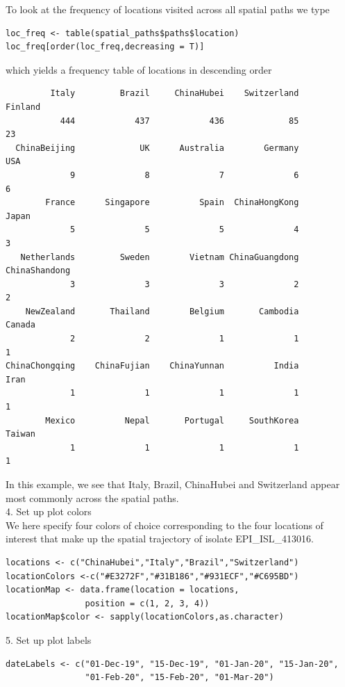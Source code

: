 \documentclass{article}
\begin{document}
To look at the frequency of locations visited across all spatial paths we type
\begin{verbatim}
loc_freq <- table(spatial_paths$paths$location)
loc_freq[order(loc_freq,decreasing = T)]
\end{verbatim}
which yields a frequency table of locations in descending order
\begin{verbatim}
         Italy         Brazil     ChinaHubei    Switzerland        Finland 
           444            437            436             85             23 
  ChinaBeijing             UK      Australia        Germany            USA 
             9              8              7              6              6 
        France      Singapore          Spain  ChinaHongKong          Japan 
             5              5              5              4              3 
   Netherlands         Sweden        Vietnam ChinaGuangdong  ChinaShandong 
             3              3              3              2              2 
    NewZealand       Thailand        Belgium       Cambodia         Canada 
             2              2              1              1              1 
ChinaChongqing    ChinaFujian    ChinaYunnan          India           Iran 
             1              1              1              1              1 
        Mexico          Nepal       Portugal     SouthKorea         Taiwan 
             1              1              1              1              1     
\end{verbatim}

In this example, we see that Italy, Brazil, ChinaHubei and Switzerland appear most commonly across the spatial paths. \\

4. Set up plot colors \\

We here specify four colors of choice corresponding to the four locations of interest that make up the spatial trajectory of isolate EPI\_ISL\_413016.

\begin{verbatim}
locations <- c("ChinaHubei","Italy","Brazil","Switzerland")
locationColors <-c("#E3272F","#31B186","#931ECF","#C695BD")
locationMap <- data.frame(location = locations,
                position = c(1, 2, 3, 4))
locationMap$color <- sapply(locationColors,as.character)                
\end{verbatim}

5. Set up plot labels
\begin{verbatim}
dateLabels <- c("01-Dec-19", "15-Dec-19", "01-Jan-20", "15-Jan-20",
                "01-Feb-20", "15-Feb-20", "01-Mar-20")
\end{verbatim}
\end{document}
